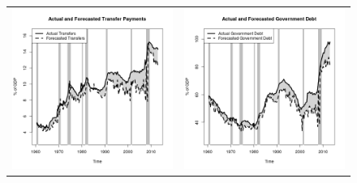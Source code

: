 \documentclass[11pt]{article}
\begin{document}
\begin{figure}
\begin{center}
\begin{tabular}{cc}
\includegraphics[scale=0.45]{./results/pics0.04/pred_transfers.png} & \includegraphics[scale=0.45]{./results/pics0.04/pred_debt.png}  
\end{tabular}
\end{center}
\end{figure} 
\end{document}
